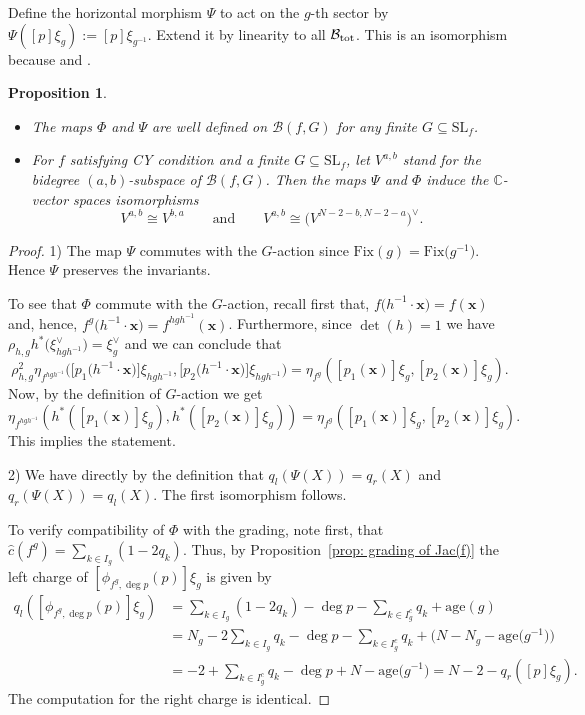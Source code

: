 \documentclass[pdftex]{sigma}
\numberwithin{equation}{section}
\newtheorem{Proposition}[Theorem]{Proposition}
 { \theoremstyle{definition}
\newtheorem{Definition}[Theorem]{Definition}
\newtheorem{Note}[Theorem]{Note}
\newtheorem{Example}[Theorem]{Example}
\newtheorem{Remark}[Theorem]{Remark} }
\newcommand{\CC}{{\mathbb{C}}}
\newcommand{\SL}{{\mathrm{SL}}}
\newcommand{\Jac}{\mathrm{Jac}}
\newcommand{\Fix}{\mathrm{Fix}}
\newcommand{\age}{\mathrm{age}}
\def\B{{\mathcal B}}
\begin{document}
Define the horizontal morphism $\Psi$ to act on the $g$-th sector by $\Psi([p] \xi_g) := [p] \xi_{g^{-1}}$.
Extend it by linearity to all $\B_{\rm tot}$.
This is an isomorphism because  and \smash{$\Jac(f^g) = \Jac\bigl(f^{g^{-1}}\bigr)$}.
\begin{Proposition}\label{proposition: Serre and Hodge under CY}\quad
\begin{itemize}\itemsep=0pt
\item[$(1)$] The maps $\Phi$ and $\Psi$ are well defined on $\B(f,G)$ for any finite $G \subseteq \SL_f$.
\item[$(2)$]	For $f$ satisfying CY condition and a finite $G \subseteq \SL_f$, let $V^{a,b}$ stand for the bidegree $(a,b)$-subspace of $\B(f,G)$.
	Then the maps $\Psi$ and $\Phi$ induce the $\CC$-vector spaces isomorphisms
	\[
		V^{a,b} \cong V^{b,a} \qquad \text{and} \qquad V^{a,b} \cong \bigl(V^{N-2-b,N-2-a}\bigr)^\vee.
	\]
\end{itemize}
\end{Proposition}
\begin{proof}
1) The map $\Psi$ commutes with the $G$-action since $\Fix(g)=\Fix\bigl(g^{-1}\bigr)$. Hence $\Psi$ preserves the invariants.

To see that $\Phi$ commute with the $G$-action, recall first that, $f\bigl(h^{-1}\cdot \mathbf{x}\bigr)=f(\mathbf{x})$ and, hence, $f^g\bigl(h^{-1}\cdot \mathbf{x}\bigr)=f^{hgh^{-1}}(\mathbf{x})$.
Furthermore, since $\det(h)=1$ we have $\rho_{h,g}h^*\bigl(\xi_{hgh^{-1}}^\vee\bigr)= \xi^\vee_g$ and we can conclude that
\[
\rho_{h,g}^{2}\eta_{f^{hgh^{-1}}}\bigl(\bigl[p_1\bigl(h^{-1}\cdot\mathbf{x}\bigr)\bigr]\xi_{hgh^{-1}},
\bigl[p_2\bigl(h^{-1}\cdot\mathbf{x}\bigr)\bigr]\xi_{hgh^{-1}}\bigr)=
\eta_{f^{g}}([p_1(\mathbf{x})]\xi_{g},[p_2(\mathbf{x})]\xi_{g}).
\]
Now, by the definition of $G$-action we get
\[
\eta_{f^{hgh^{-1}}}(h^*([p_1(\mathbf{x})]\xi_{g}),h^*([p_2(\mathbf{x})]\xi_{g}))=
\eta_{f^{g}}([p_1(\mathbf{x})]\xi_{g},[p_2(\mathbf{x})]\xi_{g}).
\]
This implies the statement.

2) We have directly by the definition that $q_l(\Psi(X)) = q_r(X)$ and $q_r(\Psi(X)) = q_l(X)$. The first isomorphism follows.

To verify compatibility of $\Phi$ with the grading, note first, that $\widehat{c}(f^g)=\sum_{k\in I_g}(1-2q_k)$. Thus, by Proposition~\ref{prop: grading of Jac(f)} the left charge of $[\phi_{f^g,\deg p}(p)]\xi_g$ is given by
\begin{align*}q_l([\phi_{f^g,\deg p}(p)]\xi_g) &= \sum_{k\in I_g}(1-2q_k)-\deg p- \sum_{k \in I_g^c} q_{k} + \age{(g)}
\\ &=N_g-2\sum_{k\in I_g} q_k-\deg p- \sum_{k \in I_g^c} q_{k}+\bigl(N-N_g-\age{\bigl(g^{-1}\bigr)}\bigr)
\\ &=-2+\sum_{k\in I^c_g} q_k-\deg p +N-\age{\bigl(g^{-1}\bigr)}=N-2-q_r([p]\xi_g).
\end{align*}
The computation for the right charge is identical.
\end{proof}
\end{document}
